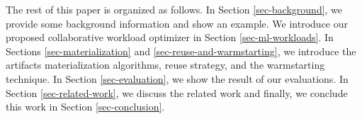 The rest of this paper is organized as follows.
In Section \ref{sec-background}, we provide some background information and show an example.
We introduce our proposed collaborative workload optimizer in Section \ref{sec-ml-workloads}.
In Sections \ref{sec-materialization} and \ref{sec-reuse-and-warmstarting}, we introduce the artifacts materialization algorithms, reuse strategy, and the warmstarting technique. 
In Section \ref{sec-evaluation}, we show the result of our evaluations.
In Section \ref{sec-related-work}, we discuss the related work and finally, we conclude this work in Section \ref{sec-conclusion}.